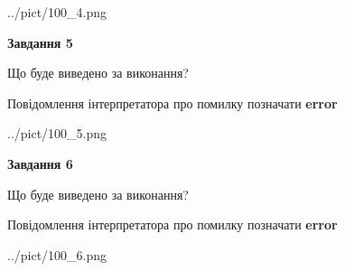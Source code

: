 \documentclass[12pt, ukrainian]{article}
\begin{document}
{\begin{center}
	{../pict/100_4.png}
\end{center}
\newpage

{\begin {center}\textbf{Завдання 5}\end {center}}\par
Що буде виведено за виконання? \par
Повідомлення інтерпретатора про помилку позначати \textbf{error}

\begin{center}
	{../pict/100_5.png}
\end{center}
\newpage

{\begin {center}\textbf{Завдання 6}\end {center}}\par
Що буде виведено за виконання? \par
Повідомлення інтерпретатора про помилку позначати \textbf{error}

\begin{center}
	{../pict/100_6.png}
\end{center}
\newpage

}
\end{document}
